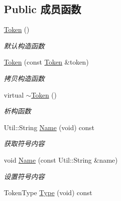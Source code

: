 \subsection*{Public 成员函数}
\begin{DoxyCompactItemize}
\item 
\hypertarget{class_lexer_sys_1_1_token_a819890dc4f25c556fe181407ae63d8db}{\hyperlink{class_lexer_sys_1_1_token_a819890dc4f25c556fe181407ae63d8db}{Token} ()}\label{class_lexer_sys_1_1_token_a819890dc4f25c556fe181407ae63d8db}

\begin{DoxyCompactList}\small\item\em 默认构造函数 \end{DoxyCompactList}\item 
\hypertarget{class_lexer_sys_1_1_token_a4d838ceee443d20a38654c4295b29810}{\hyperlink{class_lexer_sys_1_1_token_a4d838ceee443d20a38654c4295b29810}{Token} (const \hyperlink{class_lexer_sys_1_1_token}{Token} \&token)}\label{class_lexer_sys_1_1_token_a4d838ceee443d20a38654c4295b29810}

\begin{DoxyCompactList}\small\item\em 拷贝构造函数 \end{DoxyCompactList}\item 
\hypertarget{class_lexer_sys_1_1_token_a55d6dd054883e68770f770437d5d06fd}{virtual \hyperlink{class_lexer_sys_1_1_token_a55d6dd054883e68770f770437d5d06fd}{$\sim$\-Token} ()}\label{class_lexer_sys_1_1_token_a55d6dd054883e68770f770437d5d06fd}

\begin{DoxyCompactList}\small\item\em 析构函数 \end{DoxyCompactList}\item 
Util\-::\-String \hyperlink{class_lexer_sys_1_1_token_a05424f46049d2701d04936f456bd0896}{Name} (void) const 
\begin{DoxyCompactList}\small\item\em 获取符号内容 \end{DoxyCompactList}\item 
void \hyperlink{class_lexer_sys_1_1_token_ab540eab21dae6ab3f000976d301bb4e9}{Name} (const Util\-::\-String \&name)
\begin{DoxyCompactList}\small\item\em 设置符号内容 \end{DoxyCompactList}\item 
\hypertarget{class_lexer_sys_1_1_token_a8eeeb79c00169b894718ccb6c4691c24}{Token\-Type \hyperlink{class_lexer_sys_1_1_token_a8eeeb79c00169b894718ccb6c4691c24}{Type} (void) const }\label{class_lexer_sys_1_1_token_a8eeeb79c00169b894718ccb6c4691c24}


\end{DoxyCompactItemize}
